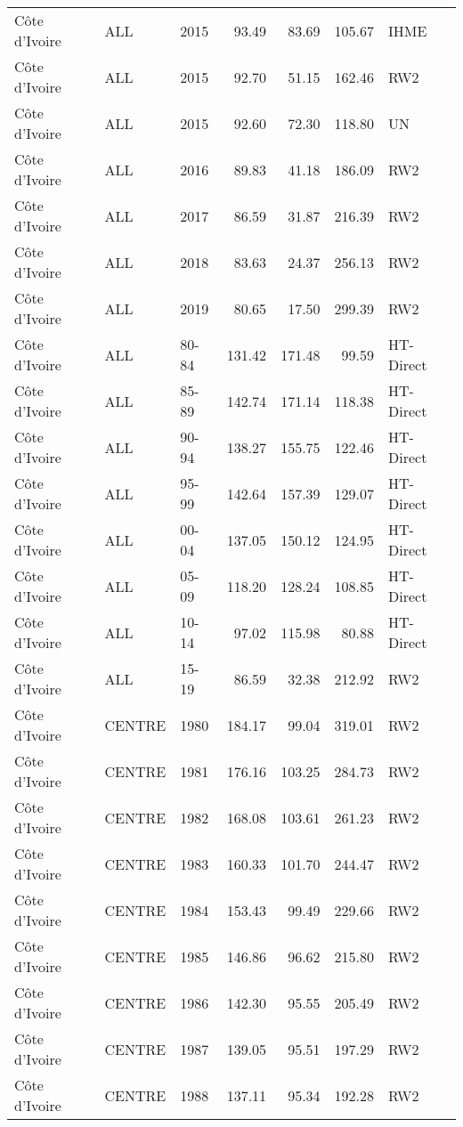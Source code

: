 \begin{longtable}{lllrrrl}
  C\^{o}te d'Ivoire & ALL & 2015 & 93.49 & 83.69 & 105.67 & IHME \\ 
  C\^{o}te d'Ivoire & ALL & 2015 & 92.70 & 51.15 & 162.46 & RW2 \\ 
  C\^{o}te d'Ivoire & ALL & 2015 & 92.60 & 72.30 & 118.80 & UN \\ 
  C\^{o}te d'Ivoire & ALL & 2016 & 89.83 & 41.18 & 186.09 & RW2 \\ 
  C\^{o}te d'Ivoire & ALL & 2017 & 86.59 & 31.87 & 216.39 & RW2 \\ 
  C\^{o}te d'Ivoire & ALL & 2018 & 83.63 & 24.37 & 256.13 & RW2 \\ 
  C\^{o}te d'Ivoire & ALL & 2019 & 80.65 & 17.50 & 299.39 & RW2 \\ 
  C\^{o}te d'Ivoire & ALL & 80-84 & 131.42 & 171.48 & 99.59 & HT-Direct \\ 
  C\^{o}te d'Ivoire & ALL & 85-89 & 142.74 & 171.14 & 118.38 & HT-Direct \\ 
  C\^{o}te d'Ivoire & ALL & 90-94 & 138.27 & 155.75 & 122.46 & HT-Direct \\ 
  C\^{o}te d'Ivoire & ALL & 95-99 & 142.64 & 157.39 & 129.07 & HT-Direct \\ 
  C\^{o}te d'Ivoire & ALL & 00-04 & 137.05 & 150.12 & 124.95 & HT-Direct \\ 
  C\^{o}te d'Ivoire & ALL & 05-09 & 118.20 & 128.24 & 108.85 & HT-Direct \\ 
  C\^{o}te d'Ivoire & ALL & 10-14 & 97.02 & 115.98 & 80.88 & HT-Direct \\ 
  C\^{o}te d'Ivoire & ALL & 15-19 & 86.59 & 32.38 & 212.92 & RW2 \\ 
  C\^{o}te d'Ivoire & CENTRE & 1980 & 184.17 & 99.04 & 319.01 & RW2 \\ 
  C\^{o}te d'Ivoire & CENTRE & 1981 & 176.16 & 103.25 & 284.73 & RW2 \\ 
  C\^{o}te d'Ivoire & CENTRE & 1982 & 168.08 & 103.61 & 261.23 & RW2 \\ 
  C\^{o}te d'Ivoire & CENTRE & 1983 & 160.33 & 101.70 & 244.47 & RW2 \\ 
  C\^{o}te d'Ivoire & CENTRE & 1984 & 153.43 & 99.49 & 229.66 & RW2 \\ 
  C\^{o}te d'Ivoire & CENTRE & 1985 & 146.86 & 96.62 & 215.80 & RW2 \\ 
  C\^{o}te d'Ivoire & CENTRE & 1986 & 142.30 & 95.55 & 205.49 & RW2 \\ 
  C\^{o}te d'Ivoire & CENTRE & 1987 & 139.05 & 95.51 & 197.29 & RW2 \\ 
  C\^{o}te d'Ivoire & CENTRE & 1988 & 137.11 & 95.34 & 192.28 & RW2 \\ 

\end{longtable}

